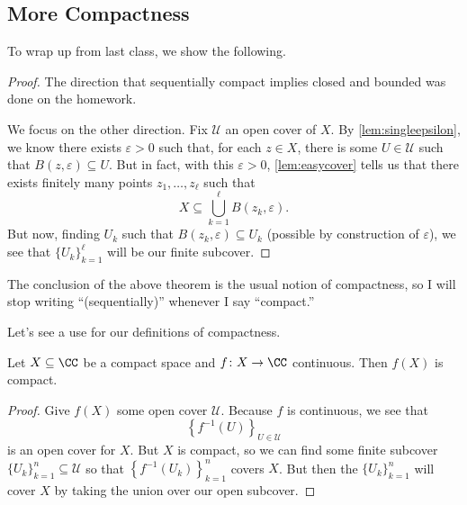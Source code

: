 
\subsection{More Compactness}
To wrap up from last class, we show the following.
\heineborel*
\begin{proof}
	The direction that sequentially compact implies closed and bounded was done on the homework.
	
	We focus on the other direction. Fix $\mathcal U$ an open cover of $X$. By \autoref{lem:singleepsilon}, we know there exists $\varepsilon>0$ such that, for each $z\in X$, there is some $U\in\mathcal U$ such that $B(z,\varepsilon)\subseteq U$. But in fact, with this $\varepsilon>0$, \autoref{lem:easycover} tells us that there exists finitely many points $z_1,\ldots,z_\ell$ such that
	\[X\subseteq\bigcup_{k=1}^\ell B(z_k,\varepsilon).\]
	But now, finding $U_k$ such that $B(z_k,\varepsilon)\subseteq U_k$ (possible by construction of $\varepsilon$), we see that $\{U_k\}_{k=1}^\ell$ will be our finite subcover.
\end{proof}
\begin{remark}
	The conclusion of the above theorem is the usual notion of compactness, so I will stop writing ``(sequentially)'' whenever I say ``compact.''
\end{remark}
Let's see a use for our definitions of compactness.
\begin{corollary}
	Let $X\subseteq\CC$ be a compact space and $f\colon X\to\CC$ continuous. Then $f(X)$ is compact.
\end{corollary}
\begin{proof}
	Give $f(X)$ some open cover $\mathcal U$. Because $f$ is continuous, we see that
	\[\left\{f^{-1}(U)\right\}_{U\in\mathcal U}\]
	is an open cover for $X$. But $X$ is compact, so we can find some finite subcover $\{U_k\}_{k=1}^n\subseteq\mathcal U$ so that $\left\{f^{-1}(U_k)\right\}_{k=1}^n$ covers $X$. But then the $\{U_k\}_{k=1}^n$ will cover $X$ by taking the union over our open subcover.
\end{proof}


